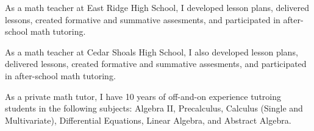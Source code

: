 


As a math teacher at East Ridge High School, I developed lesson plans, delivered lessons, created formative and summative assesments, and participated in after-school math tutoring.

As a math teacher at Cedar Shoals High School, I also developed lesson plans, delivered lessons, created formative and summative assesments, and participated in after-school math tutoring.

As a private math tutor, I have 10 years of off-and-on experience tutroing students in the following subjects: Algebra II, Precalculus, Calculus (Single and Multivariate), Differential Equations, Linear Algebra, and Abstract Algebra.

